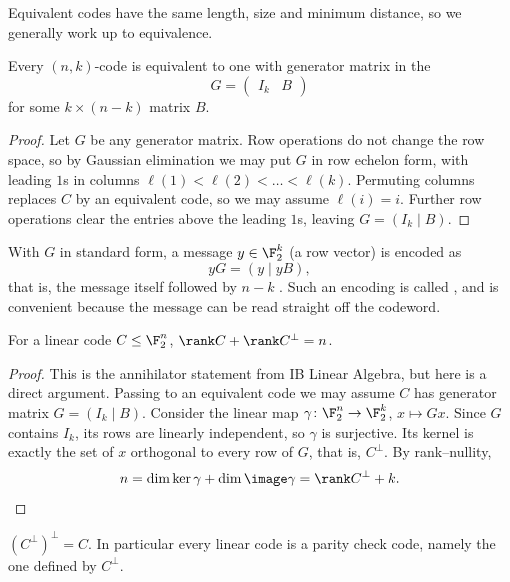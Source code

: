 Equivalent codes have the same length, size and minimum distance, so we generally work up to equivalence.

\begin{lemma}\label{lem:standardform}
	Every $(n,k)$-code is equivalent to one with generator matrix in the 
	$$G = \begin{pmatrix} I_k & B\end{pmatrix}$$
	for some $k\times(n-k)$ matrix $B$.
\end{lemma}

\begin{proof}
	Let $G$ be any generator matrix. Row operations do not change the row space, so by Gaussian elimination we may put $G$ in row echelon form, with leading $1$s in columns $\ell(1)<\ell(2)<\dots<\ell(k)$. Permuting columns replaces $C$ by an equivalent code, so we may assume $\ell(i)=i$. Further row operations clear the entries above the leading $1$s, leaving $G = (I_k \mid B)$.
\end{proof}

With $G$ in standard form, a message $y \in \F_2^k$ (a row vector) is encoded as
$$yG = (y \mid yB),$$
that is, the message itself followed by $n-k$ . Such an encoding is called , and is convenient because the message can be read straight off the codeword.

\begin{lemma}\label{lem:dualdim}
	For a linear code $C \le \F_2^n$, $\rank C + \rank C^\perp = n$.
\end{lemma}

\begin{proof}
	This is the annihilator statement from IB Linear Algebra, but here is a direct argument. Passing to an equivalent code we may assume $C$ has generator matrix $G = (I_k \mid B)$. Consider the linear map $\gamma\colon \F_2^n \to \F_2^k$, $x \mapsto Gx$. Since $G$ contains $I_k$, its rows are linearly independent, so $\gamma$ is surjective. Its kernel is exactly the set of $x$ orthogonal to every row of $G$, that is, $C^\perp$. By rank--nullity,
	$$n = \dim\ker\gamma + \dim\image\gamma = \rank C^\perp + k. \qedhere$$
\end{proof}

\begin{corollary}
	$(C^\perp)^\perp = C$. In particular every linear code is a parity check code, namely the one defined by $C^\perp$.
\end{corollary}

